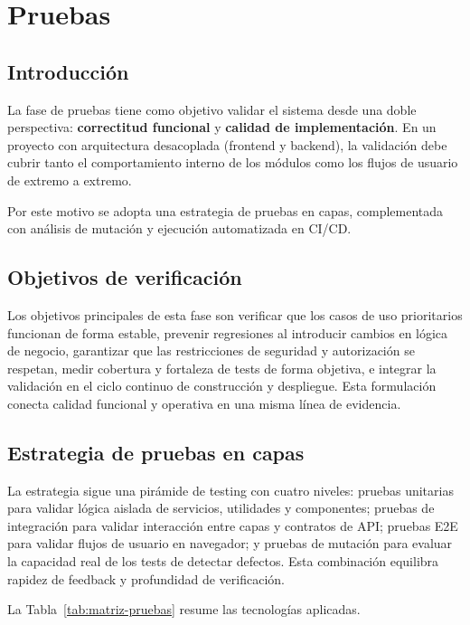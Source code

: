 ﻿\chapter{Pruebas}\label{pruebas}

\FloatBarrier
\section{Introducci\'on}

La fase de pruebas tiene como objetivo validar el sistema desde una doble perspectiva:
\textbf{correctitud funcional} y \textbf{calidad de implementaci\'on}.
En un proyecto con arquitectura desacoplada (frontend y backend),
la validaci\'on debe cubrir tanto el comportamiento interno de los m\'odulos
como los flujos de usuario de extremo a extremo.

Por este motivo se adopta una estrategia de pruebas en capas,
complementada con an\'alisis de mutaci\'on y ejecuci\'on automatizada en CI/CD.

\FloatBarrier
\section{Objetivos de verificaci\'on}

Los objetivos principales de esta fase son verificar que los casos de uso prioritarios funcionan de forma estable, prevenir regresiones al introducir cambios en l\'ogica de negocio, garantizar que las restricciones de seguridad y autorizaci\'on se respetan, medir cobertura y fortaleza de tests de forma objetiva, e integrar la validaci\'on en el ciclo continuo de construcci\'on y despliegue. Esta formulaci\'on conecta calidad funcional y operativa en una misma l\'inea de evidencia.

\FloatBarrier
\section{Estrategia de pruebas en capas}

La estrategia sigue una pir\'amide de testing con cuatro niveles: pruebas unitarias para validar l\'ogica aislada de servicios, utilidades y componentes; pruebas de integraci\'on para validar interacci\'on entre capas y contratos de API; pruebas E2E para validar flujos de usuario en navegador; y pruebas de mutaci\'on para evaluar la capacidad real de los tests de detectar defectos. Esta combinaci\'on equilibra rapidez de feedback y profundidad de verificaci\'on.

La Tabla~\ref{tab:matriz-pruebas} resume las tecnolog\'ias aplicadas.

